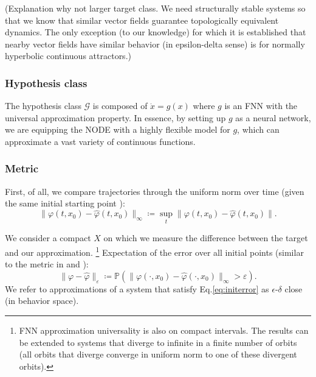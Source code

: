 \documentclass{article}
\newcommand{\ascomment}[1]{\textcolor{ascolor}{(#1)}}
\newcommand{\vol}{\operatorname{vol}}
\newcounter{ct}
\begin{document}
\ascomment{Explanation why not larger target class. We need structurally stable systems so that we know that similar vector fields guarantee topologically equivalent dynamics. The only exception (to our knowledge) for which it is established that nearby vector fields have similar behavior (in epsilon-delta sense) is for normally hyperbolic continuous attractors.}

\subsubsection{Hypothesis class}\label{sec:hypothesis}
The hypothesis class $\mathcal{G}$ is composed of $\dot x = g(x)$
where $g$ is an FNN with the universal approximation property. %
In essence, by setting up $g$ as a neural network, we are equipping the NODE with a highly flexible model for $g$, which can approximate a vast variety of continuous functions. 



\subsubsection{Metric}\label{sec:metric}
First, of all, we compare trajectories through the uniform norm over time (given the same initial starting point  \citep{girard2007approximation}):
\begin{equation}
\|\varphi(t,x_0)-\hat \varphi(t,x_0)\|_\infty \coloneqq \sup_t\|\varphi(t,x_0)-\hat \varphi(t,x_0)\|.
\end{equation}

We consider a compact $X$ on which we measure the difference between the target and our approximation.
\footnote{FNN approximation universality is also on compact intervals.
The results can be extended to systems that diverge to infinite in a finite number of orbits (all orbits that diverge converge in uniform norm to one of these divergent orbits).}
%
Expectation of the error over all initial points (similar to the metric in  \citep{hammer2000approximation} and  \citep{hanson2021learning}):
\begin{equation}\label{eq:initerror}
\|\varphi-\hat \varphi\|_\varepsilon \coloneqq  \mathbb{P}\left(\|\varphi(\cdot,x_0)-\hat \varphi(\cdot,x_0)\|_\infty>\varepsilon\right).
\end{equation}
We refer to approximations of a system that satisfy Eq.\ref{eq:initerror} as $\epsilon$-$\delta$ close (in behavior space).
\end{document}
